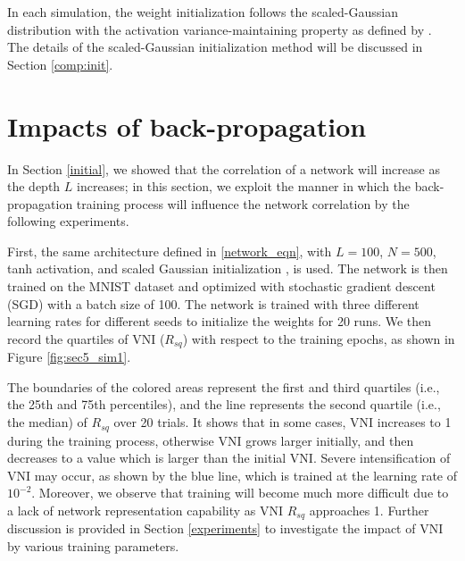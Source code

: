 
% 

In each simulation, the weight initialization follows the scaled-Gaussian distribution with the
activation variance-maintaining property as defined by \cite{xavier, he}. The details of the
scaled-Gaussian initialization method will be discussed in Section \ref{comp:init}.
%

\section{Impacts of back-propagation} \label{backprop}

In Section \ref{initial}, we showed that the correlation of a network will increase as the depth $L$ increases; in this section, we exploit the manner in which the back-propagation training process will influence the network correlation by the following experiments. 




First, the same architecture defined in \eqref{network_eqn}, with $L=100$, $N=500$, tanh activation, 
and scaled Gaussian initialization \cite{xavier}, is used. The network is then trained on the MNIST
dataset \cite{mnist} and optimized with stochastic gradient descent (SGD) with a batch size of 100.
The network is trained with three different learning rates for different seeds to initialize the weights
for 20 runs. We then record the quartiles of VNI ($R_{sq}$) with respect to the training epochs, as shown in
Figure \ref{fig:sec5_sim1}.

The boundaries of the colored areas represent the first and third quartiles (i.e., the 25th and 75th
percentiles), and the line represents the second quartile (i.e., the median) of $R_{sq}$ over 20 trials.
% 
% 
It shows that in some cases, VNI increases to 1 during the training process, otherwise VNI grows larger
initially, and then decreases to a value which is larger than the initial VNI.
Severe intensification of VNI may occur, as shown by the blue line, which is trained at the learning rate
of $10^{-2} $. 
Moreover, we observe that training will become much more difficult due to a lack of network representation
capability as VNI $R_{sq}$ approaches 1.
Further discussion is provided in Section \ref{experiments} to investigate the impact of VNI by various
training parameters.

